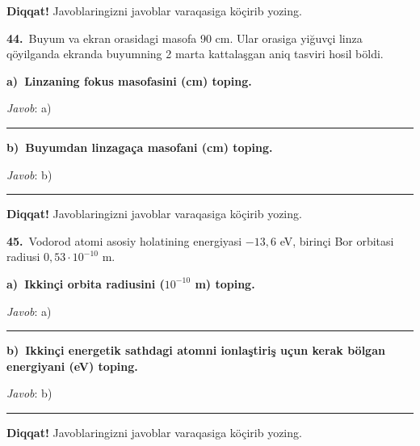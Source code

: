 \documentclass[11pt,a4paper]{article}
\newcommand{\blank}{\rule{5cm}{0.4pt}}
\begin{document}
\medskip\noindent\textbf{Diqqat!} Javoblaringizni javoblar varaqasiga köçirib yozing.\par\vspace{10pt}
\noindent\textbf{44.}\ Buyum va ekran orasidagi masofa 90 cm. Ular orasiga yiğuvçi linza qöyilganda ekranda buyumning 2 marta kattalaşgan aniq tasviri hosil böldi.\par\smallskip
\medskip\noindent\textbf{a)\ Linzaning fokus masofasini (cm) toping.}\par
\noindent\textit{Javob}: a)\ \blank\par
\medskip\noindent\textbf{b)\ Buyumdan linzagaça masofani (cm) toping.}\par
\noindent\textit{Javob}: b)\ \blank\par
\medskip\noindent\textbf{Diqqat!} Javoblaringizni javoblar varaqasiga köçirib yozing.\par\vspace{10pt}
\noindent\textbf{45.}\ Vodorod atomi asosiy holatining energiyasi $-13{,}6$ eV, birinçi Bor orbitasi radiusi $0{,}53\cdot10^{-10}$ m.\par\smallskip
\medskip\noindent\textbf{a)\ Ikkinçi orbita radiusini ($10^{-10}$ m) toping.}\par
\noindent\textit{Javob}: a)\ \blank\par
\medskip\noindent\textbf{b)\ Ikkinçi energetik sathdagi atomni ionlaştiriş uçun kerak bölgan energiyani (eV) toping.}\par
\noindent\textit{Javob}: b)\ \blank\par
\medskip\noindent\textbf{Diqqat!} Javoblaringizni javoblar varaqasiga köçirib yozing.\par\vspace{10pt}
\end{document}
